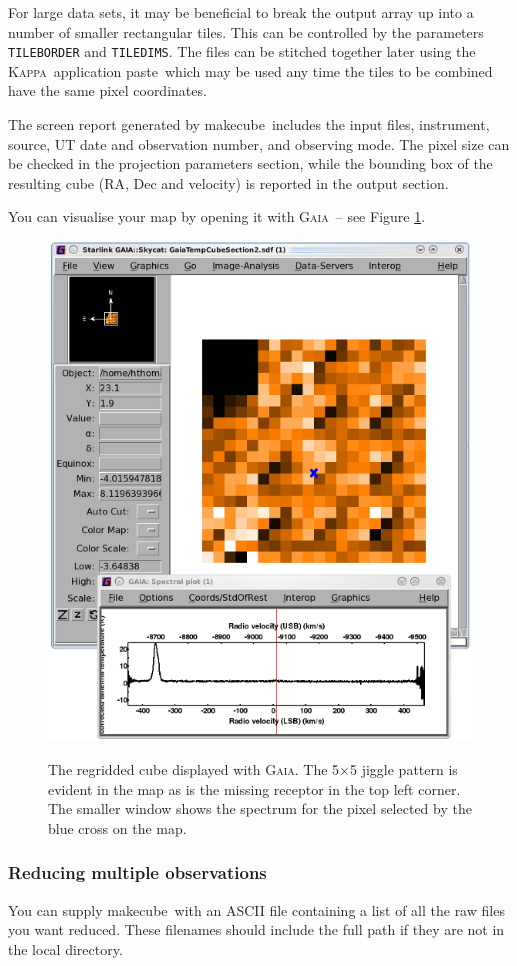 \documentclass[twoside,11pt]{article}
\newcommand{\xref}[3]{#1}
\renewcommand{\_}{\texttt{\symbol{95}}}
\newcommand{\gaia}{\xref{\textsc{Gaia}}{sun214}{}}
\newcommand{\Kappa}{\xref{\textsc{Kappa}}{sun95}{}}
\newcommand{\task}[1]{\textsf{#1}}
\newcommand{\param}[1]{\texttt{#1}}
\newcommand{\makecube}{\xref{\task{makecube}}{sun258}{MAKECUBE}}
\newcommand{\paste}{\xref{\task{paste}}{sun95}{PASTE}}
\begin{document}
For large data sets, it may be beneficial to break the output array up into a number of smaller rectangular tiles. This can be controlled by the parameters \param{TILEBORDER} and   \param{TILEDIMS}. The files can be stitched together later using the \Kappa\ application \paste\ which may be used any time the tiles to be combined have the same pixel coordinates.

The screen report generated by \makecube\ includes the input files, instrument, source, UT date and observation number, and observing mode. The pixel size can be checked in the projection parameters section, while the bounding box of the resulting cube (RA, Dec and velocity) is reported in the output section.

You can visualise your map by opening it with \gaia\ -- see Figure \ref{fig:gaiareduced}.

\begin{figure}[t!]
\begin{center}
\includegraphics[width=0.65\linewidth]{sc20_makecubeout}
\label{fig:gaiareduced}
\caption[A regridded cube produced with \makecube.]{The regridded cube displayed with \gaia. The 5$\times$5 jiggle pattern is evident in the map as is the missing receptor in the top left corner. The smaller window shows the spectrum for the pixel selected by the blue cross on the map. }
\end{center}
\end{figure}

\subsubsection{Reducing multiple observations}
You can supply \makecube\ with an ASCII file containing a list of all the raw files you want reduced. These filenames should include the full path if they are not in the local directory.
\end{document}
